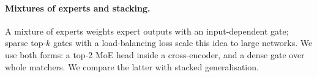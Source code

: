 \paragraph{Mixtures of experts and stacking.} A mixture of experts weights expert outputs with an
input-dependent gate; sparse top-$k$ gates with a load-balancing loss scale this
idea to large networks. We use both forms: a top-2 MoE head
inside a cross-encoder, and a dense gate over whole matchers. We compare the latter with stacked
generalisation.
